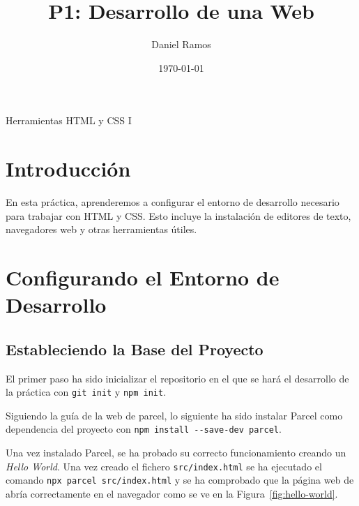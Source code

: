 \documentclass{article}
\title{P1: Desarrollo de una Web}
\author{Daniel Ramos}
\date{\today}
\begin{document}
\maketitle

\begin{center}
    \large Herramientas HTML y CSS I
\end{center}

\newpage

\tableofcontents

\newpage

\section*{Introducción}
En esta práctica, aprenderemos a configurar el entorno de desarrollo necesario para trabajar con HTML y CSS. Esto incluye la instalación de editores de texto, navegadores web y otras herramientas útiles.

\newpage

\section{Configurando el Entorno de Desarrollo}\label{sec:configurando-el-entorno-de-desarrollo}

\subsection{Estableciendo la Base del Proyecto}\label{subsec:estableciendo-la-base-del-proyecto}

El primer paso ha sido inicializar el repositorio en el que se hará el desarrollo de la práctica con \lstinline|git init| y \lstinline|npm init|.

Siguiendo la guía de la web de parcel, lo siguiente ha sido instalar Parcel como dependencia del proyecto con \lstinline|npm install --save-dev parcel|.

Una vez instalado Parcel, se ha probado su correcto funcionamiento creando un \textit{Hello World}. Una vez creado el fichero \lstinline|src/index.html| se ha ejecutado el comando \lstinline|npx parcel src/index.html| y se ha comprobado que la página web de abría correctamente en el navegador como se ve en la Figura~\ref{fig:hello-world}.
\end{document}
